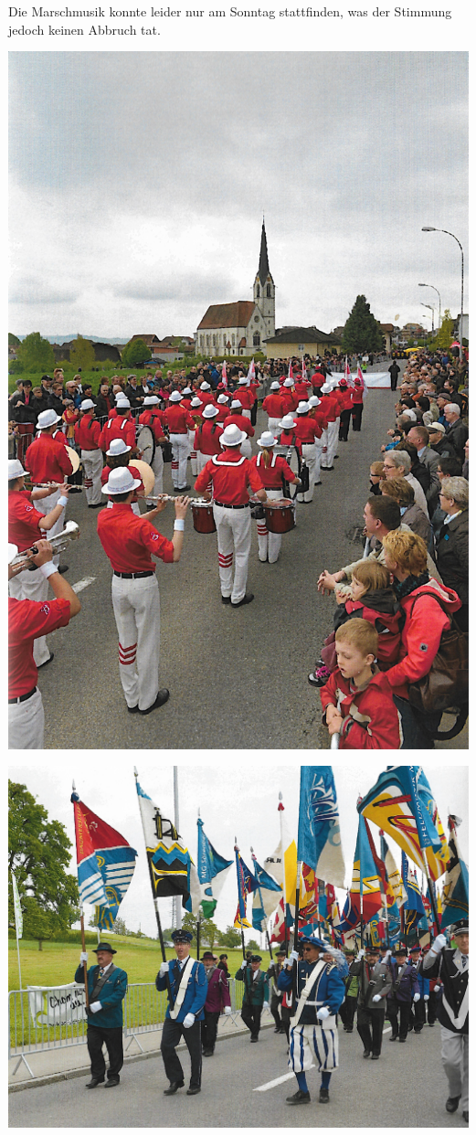 \begin{history}
    Die Marschmusik konnte leider nur am Sonntag stattfinden, was der Stimmung
    jedoch keinen Abbruch tat.

    \begin{MulticolFigure}
        \centering
        \includegraphics[width=0.6\linewidth]{./chap/2001-2024/2013/Showband-CH.jpg}
    \end{MulticolFigure}

    \begin{MulticolFigure}
        \centering
        \includegraphics[width=0.93\linewidth]{./chap/2001-2024/2013/Fahnendelegationen.jpg}
    \end{MulticolFigure}


\end{history}
